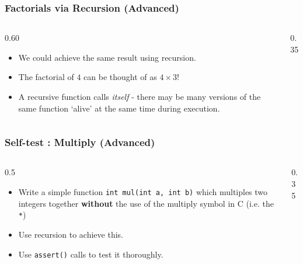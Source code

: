 
\begin{frame}[fragile]
\frametitle{Factorials via Recursion (Advanced)}
\begin{columns}

\begin{column}{0.60\textwidth}
\begin{itemize}[<+->]
\item We could achieve the same result using recursion.
\item The factorial of $4$ can be thought of as $4\times3!$
\item A recursive function calls {\it itself} - there may be many versions of the same function `alive' at the same time during execution.
\end{itemize}
\end{column}

\begin{column}{0.35\textwidth}

\end{column}

\end{columns}
\end{frame}


\begin{frame}[fragile]
\frametitle{Self-test : Multiply (Advanced)}
\begin{columns}

\begin{column}{0.5\textwidth}
\begin{itemize}[<+->]
\item Write a simple function \verb^int mul(int a, int b)^ which
multiples two integers together {\bf without} the use of the
multiply symbol in C (i.e. the \verb^*^)
\item Use recursion to achieve this.
\item Use \verb^assert()^ calls to test it thoroughly.
\end{itemize}
\end{column}

\begin{column}{0.35\textwidth}

\end{column}

\end{columns}
\end{frame}

